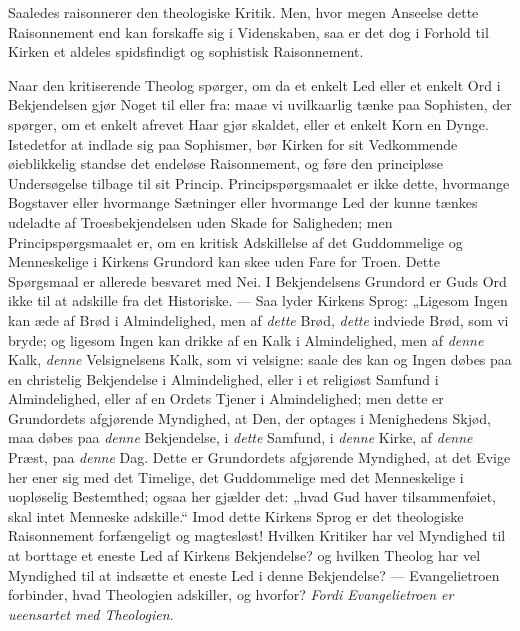 \documentclass[12pt,a4paper]{book}
\newcommand{\opage}[1]{\marginnote{\footnotesize\textit{[#1]}}}
\begin{document}
Saaledes raisonnerer den theologiske Kritik. Men, hvor megen Anseelse dette
Raisonnement end kan forskaffe sig i Videnskaben, saa er det dog i Forhold til
Kirken et aldeles spidsfindigt og sophistisk Raisonnement.

Naar den kritiserende Theolog spørger, om da et enkelt Led eller et enkelt Ord
i Bekjendelsen gjør Noget til eller fra: maae vi uvilkaarlig tænke paa
Sophisten, der spørger, om et enkelt afrevet Haar gjør skaldet, eller et enkelt
Korn en Dynge. Istedetfor at indlade sig paa Sophismer, bør Kirken for sit
Vedkommende øieblikkelig standse det endeløse Raisonnement, og føre den
principløse Undersøgelse tilbage til sit Princip. Principspørgsmaalet er ikke
dette, hvormange Bogstaver eller hvormange Sætninger eller hvormange Led der
kunne tænkes udeladte af Troesbekjendelsen uden Skade for Saligheden; men
Principspørgsmaalet er, om en kritisk Adskillelse af det Guddommelige og
Menneskelige i Kirkens Grundord kan skee uden Fare for Troen. Dette Spørgsmaal
er allerede besvaret med Nei. I Bekjendelsens Grundord er Guds Ord ikke til at
adskille fra det Historiske. --- Saa lyder Kirkens Sprog: „Ligesom Ingen kan
æde af Brød i Almindelighed, men af \emph{dette} Brød, \emph{dette} indviede
Brød, som vi bryde; og ligesom Ingen kan drikke af en Kalk i Almindelighed, men
af \emph{denne} Kalk, \emph{denne} Velsignelsens Kalk, som vi velsigne: saale\-%
\opage{25}des kan og Ingen døbes paa en christelig Bekjendelse i Almindelighed, eller i
et religiøst Samfund i Almindelighed, eller af en Ordets Tjener i
Almindelighed; men dette er Grundordets afgjørende Myndighed, at Den, der
optages i Menighedens Skjød, maa døbes paa \emph{denne} Bekjendelse, i
\emph{dette} Samfund, i \emph{denne} Kirke, af \emph{denne} Præst, paa
\emph{denne} Dag. Dette er Grundordets afgjørende Myndighed, at det Evige her
ener sig med det Timelige, det Guddommelige med det Menneskelige i uopløselig
Bestemthed; ogsaa her gjælder det: „hvad Gud haver tilsammenføiet, skal intet
Menneske adskille.“ Imod dette Kirkens Sprog er det theologiske Raisonnement
forfængeligt og magtesløst! Hvilken Kritiker har vel Myndighed til at borttage
et eneste Led af Kirkens Bekjendelse? og hvilken Theolog har vel Myndighed til
at indsætte et eneste Led i denne Bekjendelse? --- Evangelietroen forbinder,
hvad Theologien adskiller, og hvorfor? \emph{Fordi Evangelietroen er ueensartet
med Theologien.}
\end{document}
